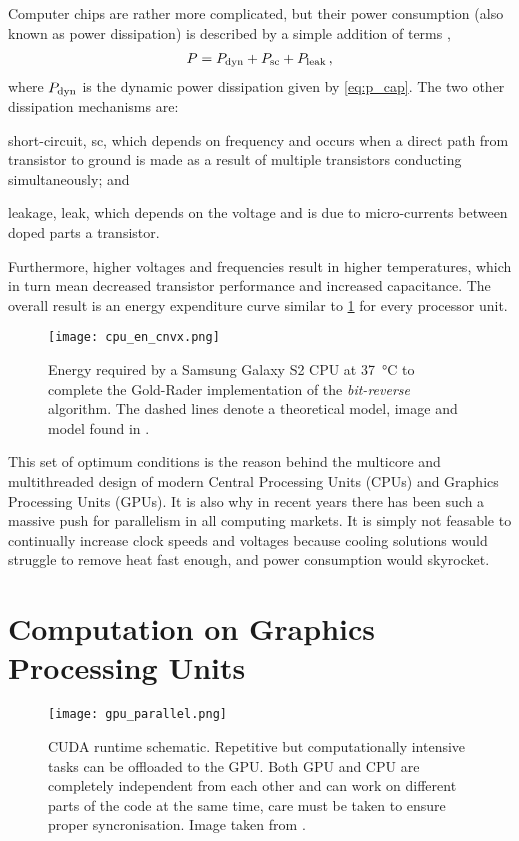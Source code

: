 Computer chips are rather more complicated, but their power consumption (also known as power dissipation) is described by a simple addition of terms \cite{cpu_pow},
\begin{align}
	P = P_{\textrm{dyn}} + P_{\textrm{sc}} + P_{\textrm{leak}}\,,
\end{align}
where $ P_{\textrm{dyn}} $ is the dynamic power dissipation given by \cref{eq:p_cap}. The two other dissipation mechanisms are:
\begin{inparaenum}[\itshape 1\upshape)]
	\item short-circuit, sc, which depends on frequency and occurs when a direct path from transistor to ground is made as a result of multiple transistors conducting simultaneously; and
	\item leakage, leak, which depends on the voltage and is due to micro-currents between doped parts a transistor.
\end{inparaenum}
Furthermore, higher voltages and frequencies result in higher temperatures, which in turn mean decreased transistor performance and increased capacitance. The overall result is an energy expenditure curve similar to \cref{f:cpu_en_cnvx} \cite{cpu_en_cnvx} for every processor unit.
\begin{figure}[t]
	\centering
	\texttt{[image: cpu\_en\_cnvx.png]}
	\caption[Energy expenditure of CPU vs Voltage.]{Energy required by a Samsung Galaxy S2 CPU at \SI{37}{\degreeCelsius} to complete the Gold-Rader implementation of the \emph{bit-reverse} algorithm. The dashed lines denote a theoretical model, image and model found in \cite{cpu_en_cnvx}.}
	\label{f:cpu_en_cnvx}
\end{figure}

This set of optimum conditions is the reason behind the multicore and multithreaded design of modern Central Processing Units (CPUs) and Graphics Processing Units (GPUs). It is also why in recent years there has been such a massive push for parallelism in all computing markets. It is simply not feasable to continually increase clock speeds and voltages because cooling solutions would struggle to remove heat fast enough, and power consumption would skyrocket.

\section{Computation on Graphics Processing Units}
\begin{figure}[t]
	\centering
	\texttt{[image: gpu\_parallel.png]}
	\caption[CUDA runtime schematic.]{CUDA runtime schematic. Repetitive but computationally intensive tasks can be offloaded to the GPU. Both GPU and CPU are completely independent from each other and can work on different parts of the code at the same time, care must be taken to ensure proper syncronisation. Image taken from \cite{nvidia}.}
	\label{f:cuda}
\end{figure}

